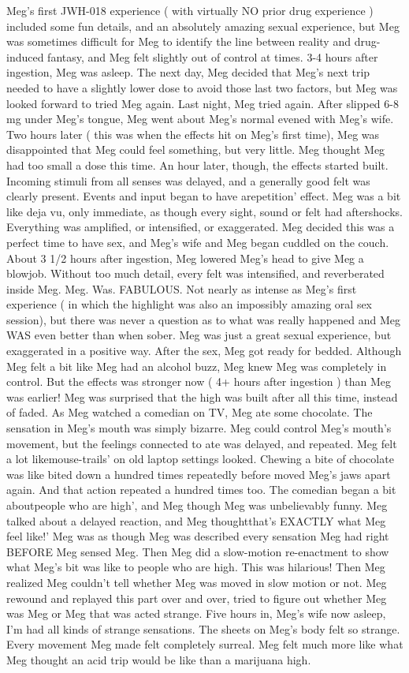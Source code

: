 \documentclass[12pt]{book}
\begin{document}
Meg's first JWH-018 experience ( with virtually NO prior drug experience ) included some fun details, and an absolutely amazing sexual experience, but Meg was sometimes difficult for Meg to identify the line between reality and drug-induced fantasy, and Meg felt slightly out of control at times. 3-4 hours after ingestion, Meg was asleep. The next day, Meg decided that Meg's next trip needed to have a slightly lower dose to avoid those last two factors, but Meg was looked forward to tried Meg again. Last night, Meg tried again. After slipped 6-8 mg under Meg's tongue, Meg went about Meg's normal evened with Meg's wife. Two hours later ( this was when the effects hit on Meg's first time), Meg was disappointed that Meg could feel something, but very little. Meg thought Meg had too small a dose this time. An hour later, though, the effects started built. Incoming stimuli from all senses was delayed, and a generally good felt was clearly present. Events and input began to have arepetition' effect. Meg was a bit like deja vu, only immediate, as though every sight, sound or felt had aftershocks. Everything was amplified, or intensified, or exaggerated. Meg decided this was a perfect time to have sex, and Meg's wife and Meg began cuddled on the couch. About 3 1/2 hours after ingestion, Meg lowered Meg's head to give Meg a blowjob. Without too much detail, every felt was intensified, and reverberated inside Meg. Meg. Was. FABULOUS. Not nearly as intense as Meg's first experience ( in which the highlight was also an impossibly amazing oral sex session), but there was never a question as to what was really happened and Meg WAS even better than when sober. Meg was just a great sexual experience, but exaggerated in a positive way. After the sex, Meg got ready for bedded. Although Meg felt a bit like Meg had an alcohol buzz, Meg knew Meg was completely in control. But the effects was stronger now ( 4+ hours after ingestion ) than Meg was earlier! Meg was surprised that the high was built after all this time, instead of faded. As Meg watched a comedian on TV, Meg ate some chocolate. The sensation in Meg's mouth was simply bizarre. Meg could control Meg's mouth's movement, but the feelings connected to ate was delayed, and repeated. Meg felt a lot likemouse-trails' on old laptop settings looked. Chewing a bite of chocolate was like bited down a hundred times repeatedly before moved Meg's jaws apart again. And that action repeated a hundred times too. The comedian began a bit aboutpeople who are high', and Meg though Meg was unbelievably funny. Meg talked about a delayed reaction, and Meg thoughtthat's EXACTLY what Meg feel like!' Meg was as though Meg was described every sensation Meg had right BEFORE Meg sensed Meg. Then Meg did a slow-motion re-enactment to show what Meg's bit was like to people who are high. This was hilarious! Then Meg realized Meg couldn't tell whether Meg was moved in slow motion or not. Meg rewound and replayed this part over and over, tried to figure out whether Meg was Meg or Meg that was acted strange. Five hours in, Meg's wife now asleep, I'm had all kinds of strange sensations. The sheets on Meg's body felt so strange. Every movement Meg made felt completely surreal. Meg felt much more like what Meg thought an acid trip would be like than a marijuana high. 
\end{document}
